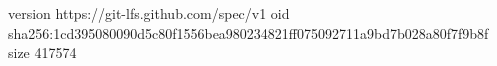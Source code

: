 version https://git-lfs.github.com/spec/v1
oid sha256:1cd395080090d5c80f1556bea980234821ff075092711a9bd7b028a80f7f9b8f
size 417574
